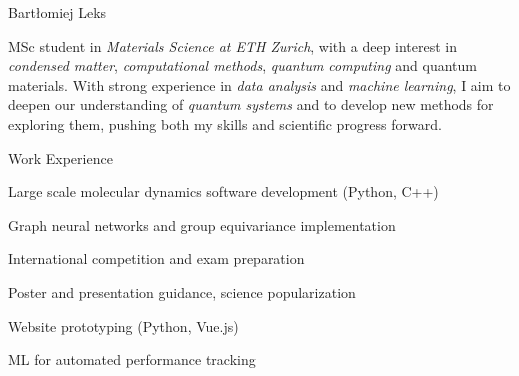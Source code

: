 \documentclass{./cv}
\begin{document}
\begin{cvheader}{Bartłomiej Leks}
    \begin{contactdetails}
        \item {}
        \item {}
        \item {}
        \item {}
    \end{contactdetails}
    \begin{contactdetails}
        \item {}
        \item \address{Zürich, Switzerland}
    \end{contactdetails}
\end{cvheader}

\vspace{-1em}
\begin{cvsection}{}
MSc student in \emph{Materials Science at ETH Zurich}, with a deep interest in \emph{condensed matter}, \emph{computational methods}, \emph{quantum computing} and quantum materials. With strong experience in \emph{data analysis} and \emph{machine learning}, I aim to deepen our understanding of \emph{quantum systems} and to develop new methods for exploring them, pushing both my skills and scientific progress forward.
\end{cvsection}


\begin{cvsection}{Work Experience}
    \begin{descrlist}
        \item Large scale molecular dynamics software development (Python, C++)
        \item Graph neural networks and group equivariance implementation
    \end{descrlist}
    \begin{descrlist}
        \item International competition and exam preparation
        \item Poster and presentation guidance, science popularization
    \end{descrlist}
    \begin{descrlist}
        \item Website prototyping (Python, Vue.js)
        \item ML for automated performance tracking
    \end{descrlist}
\end{cvsection}
\end{document}
